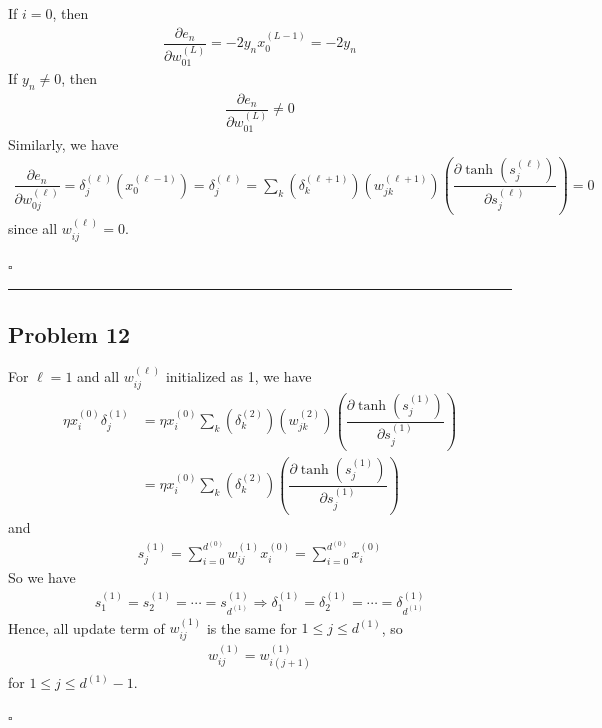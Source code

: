\documentclass[12pt]{article}
\newcommand*{\QEDB}{\hfill\ensuremath{\square}}
\newcommand{\ParTh}[1]{\left(#1\right)}
\newcommand{\horrule}[1]{\rule{\linewidth}{#1}}
\begin{document}
If $i=0$, then
\begin{align}
\dfrac{\partial e_n}{\partial w^{\ParTh{L}}_{01}}=-2y_nx^{\ParTh{L-1}}_0=-2y_n
\end{align}
If $y_n\neq0$, then
\begin{align}
\dfrac{\partial e_n}{\partial w^{\ParTh{L}}_{01}}\neq0
\end{align}
Similarly, we have
\begin{align}
\dfrac{\partial e_n}{\partial w^{\ParTh{\ell}}_{0j}}=\delta^{\ParTh{\ell}}_j\ParTh{x^{\ParTh{\ell-1}}_0}=\delta^{\ParTh{\ell}}_j=\sum_{k}\ParTh{\delta^{\ParTh{\ell+1}}_k}\ParTh{w^{\ParTh{\ell+1}}_{jk}}\ParTh{\dfrac{\partial\tanh\ParTh{s^{\ParTh{\ell}}_j}}{\partial s^{\ParTh{\ell}}_j}}=0
\end{align}
since all $w^{\ParTh{\ell}}_{ij}=0$.

\QEDB

\horrule{0.5pt}

\subsection*{Problem 12}

For $\ell=1$ and all $w^{\ParTh{\ell}}_{ij}$ initialized as 1, we have
\begin{align}
\eta x^{\ParTh{0}}_i\delta^{\ParTh{1}}_j&=\eta x^{\ParTh{0}}_i\sum_{k}\ParTh{\delta^{\ParTh{2}}_k}\ParTh{w^{\ParTh{2}}_{jk}}\ParTh{\dfrac{\partial\tanh\ParTh{s^{\ParTh{1}}_j}}{\partial s^{\ParTh{1}}_j}}\\
&=\eta x^{\ParTh{0}}_i\sum_{k}\ParTh{\delta^{\ParTh{2}}_k}\ParTh{\dfrac{\partial\tanh\ParTh{s^{\ParTh{1}}_j}}{\partial s^{\ParTh{1}}_j}}
\end{align}
and
\begin{align}
s^{\ParTh{1}}_j=\sum_{i=0}^{d^{\ParTh{0}}}w^{\ParTh{1}}_{ij}x^{\ParTh{0}}_i=\sum_{i=0}^{d^{\ParTh{0}}}x^{\ParTh{0}}_i
\end{align}
So we have
\begin{align}
s^{\ParTh{1}}_1=s^{\ParTh{1}}_2=\cdots=s^{\ParTh{1}}_{d^{\ParTh{1}}}\Rightarrow\delta^{\ParTh{1}}_1=\delta^{\ParTh{1}}_2=\cdots=\delta^{\ParTh{1}}_{d^{\ParTh{1}}}
\end{align}
Hence, all update term of $w^{\ParTh{1}}_{ij}$ is the same for $1\leq j\leq d^{\ParTh{1}}$, so
\begin{align}
w^{\ParTh{1}}_{ij}=w^{\ParTh{1}}_{i\ParTh{j+1}}
\end{align}
for $1\leq j\leq d^{\ParTh{1}}-1$.

\QEDB
\end{document}
